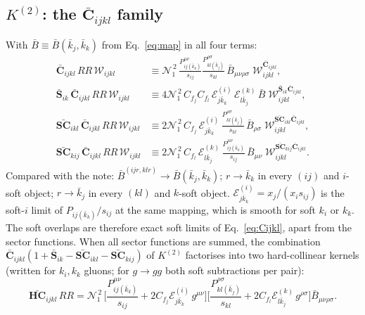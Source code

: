 \documentclass[11pt,a4paper]{article}
\newcommand{\bbC}[1]{\bar{\mathbf C}_{#1}}
\newcommand{\bbS}[1]{\bar{\mathbf S}_{#1}}
\newcommand{\bbSC}[1]{\bar{\mathbf{SC}}_{#1}}
\newcommand{\bbHC}[1]{\bar{\mathbf{HC}}_{#1}}
\newcommand{\RR}{RR}
\newcommand{\W}[1]{\mathcal W_{#1}}
\newcommand{\jb}{\bar k_{j}}
\newcommand{\kb}{\bar k_{k}}
\newcommand{\E}[3]{\mathcal E^{(#1)}_{#2#3}}
\newcommand{\Norms}{\mathcal N_1^{\,2}}
\begin{document}
\subsection{$K^{(2)}$: the $\bbC{ijkl}$ family}
With $\bar B\equiv \bar B(\jb,\kb)$ from Eq.~\eqref{eq:map} in all four terms:
\begin{align}
\bbC{ijkl}\,\RR\,\W{ijkl}
&\equiv
\Norms\,\frac{P^{\mu\nu}_{ij(\kb)}}{s_{ij}}\frac{P^{\rho\sigma}_{kl(\jb)}}{s_{kl}}\,
\bar B_{\mu\nu\rho\sigma}\;\W{ijkl}^{\bbC{ijkl}},
\label{eq:Cijkl}\\
\bbS{ik}\,\bbC{ijkl}\,\RR\,\W{ijkl}
&\equiv
4\Norms\,C_{f_j}C_{f_l}\,\E{i}{j}{\kb}\,\E{k}{l}{\jb}\,\bar B\;
\W{ijkl}^{\bbS{ik}\bbC{ijkl}},
\\
\bbSC{ikl}\,\bbC{ijkl}\,\RR\,\W{ijkl}
&\equiv
2\Norms\,C_{f_j}\,\E{i}{j}{\kb}\,\frac{P^{\rho\sigma}_{kl(\jb)}}{s_{kl}}\,\bar B_{\rho\sigma}\;
\W{ijkl}^{\bbSC{ikl}\bbC{ijkl}},
\\
\bbSC{kij}\,\bbC{ijkl}\,\RR\,\W{ijkl}
&\equiv
2\Norms\,C_{f_l}\,\E{k}{l}{\jb}\,\frac{P^{\mu\nu}_{ij(\kb)}}{s_{ij}}\,\bar B_{\mu\nu}\;
\W{ijkl}^{\bbSC{kij}\bbC{ijkl}}.
\end{align}
Compared with the note: $\bar B^{(ijr,klr)}\to\bar B(\jb,\kb)$; $r\to\kb$ in every $(ij)$ and $i$-soft object;
$r\to\jb$ in every $(kl)$ and $k$-soft object.
$\E{i}{j}{\kb}=x_j/(x_is_{ij})$ is the soft-$i$ limit of $P_{ij(\kb)}/s_{ij}$ at the same mapping,
which is smooth for soft $k_i$ or $k_k$. The soft overlaps are therefore exact soft limits of
Eq.~\eqref{eq:Cijkl}, apart from the sector functions. When all sector functions are summed,
the combination $\bbC{ijkl}(1+\bbS{ik}-\bbSC{ikl}-\bbSC{kij})$ of $K^{(2)}$ factorises into two
hard-collinear kernels (written for $k_i,k_k$ gluons; for $g\to gg$ both soft subtractions per pair):
\begin{equation}
\bbHC{ijkl}\,\RR=\Norms\,
\Big[\frac{P^{\mu\nu}_{ij(\kb)}}{s_{ij}}+2C_{f_j}\E{i}{j}{\kb}\,g^{\mu\nu}\Big]
\Big[\frac{P^{\rho\sigma}_{kl(\jb)}}{s_{kl}}+2C_{f_l}\E{k}{l}{\jb}\,g^{\rho\sigma}\Big]
\bar B_{\mu\nu\rho\sigma}.
\end{equation}
\end{document}
